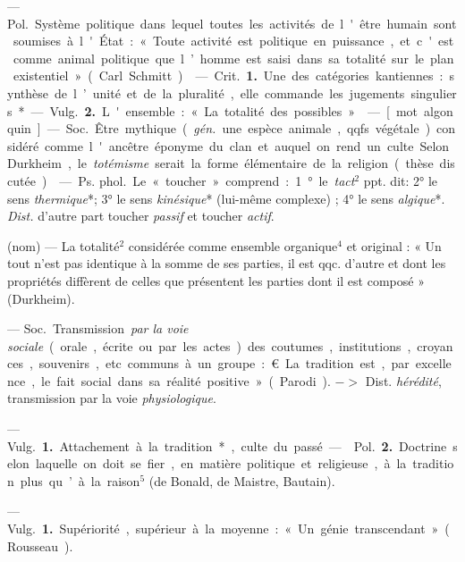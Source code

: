 \begin{itemize}[leftmargin=1cm, label=, itemsep=1pt]
 — \si{Pol.} Système politique dans lequel toutes les
activités de l'être humain sont soumises à l'État : « Toute activité est
politique en puissance, et c'est comme animal politique que l’homme est saisi
dans sa totalité sur le plan existentiel » (Carl Schmitt).

 — \si{Crit.} {\bf 1.} Une des catégories kantiennes : synthèse
de l’unité et de la pluralité, elle commande les jugements singuliers*.

— \si{Vulg.} {\bf 2.} L'ensemble : « La totalité des possibles. »

 — [mot algonquin] — \si{Soc.} Être mythique ({\it gén.} une espèce
animale, qqfs. végétale) considéré comme l'ancêtre éponyme du clan et auquel
on rend un culte. Selon Durkheim, le {\it totémisme} serait la forme
élémentaire de la religion (thèse discutée).

 — \si{Ps. phol.} Le « toucher » comprend : 1° le {\it tact}$^2$
ppt. dit: 2° le sens {\it thermique}*; 3° le sens {\it kinésique}* (lui-même
complexe) ; 4° le sens {\it algique}*. {\it Dist.} d'autre part toucher {\it
passif} et toucher {\it actif}.

 (nom) — La totalité$^2$ considérée comme ensemble organique$^4$ et
original : « Un tout n’est pas identique à la somme de ses parties, il est
qqc. d’autre et dont les propriétés diffèrent de celles que présentent les
parties dont il est composé » (Durkheim).

 — \si{Soc.} Transmission {\it par la voie sociale} (orale,
écrite ou par les actes) des coutumes, institutions, croyances, souvenirs,
etc. communs à un groupe : € La tradition est, par excellence, le fait social
dans sa réalité positive » (Parodi). $->$ Dist. {\it hérédité}, transmission
par la voie {\it physiologique}.

 —  \si{Vulg.} {\bf 1.} Attachement à la
tradition*, culte du passé. —  \si{Pol.} {\bf 2.} Doctrine
selon laquelle on doit se fier, en matière politique et religieuse, à la
tradition plus qu’à la raison$^5$ (de Bonald, de Maistre, Bautain).

 — \si{Vulg.} {\bf 1.} Supériorité, supérieur
à la moyenne : « Un génie transcendant » (Rousseau).


\end{itemize}

